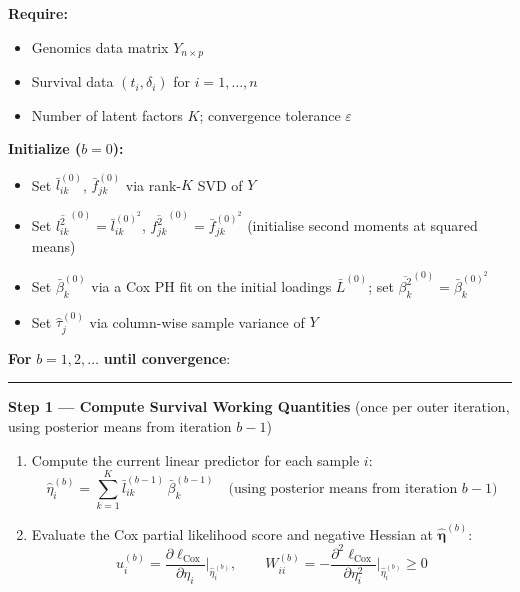 \documentclass{article}[12pt]
\newcommand{\lbar}[2]{\bar{l}_{#1#2}}
\newcommand{\fbar}[2]{\bar{f}_{#1#2}}
\newcommand{\bbar}[1]{\bar{\beta}_{#1}}
\newcommand{\lsec}[2]{\overline{l^{2}_{#1#2}}}
\newcommand{\fsec}[2]{\overline{f^{2}_{#1#2}}}
\newcommand{\bsec}[1]{\overline{\beta^{2}_{#1}}}
\begin{document}
\begin{tcolorbox}[
  breakable,
  colback=gray!4!white, colframe=black!70,
  title={\textbf{Algorithm 1.} Supervised MF --- CAVI Update Procedure},
  fonttitle=\bfseries, left=6pt, right=6pt, top=6pt, bottom=6pt
]

\textbf{Require:}
\begin{itemize}[noitemsep, topsep=2pt]
    \item Genomics data matrix $Y_{n\times p}$
    \item Survival data $(t_i, \delta_i)$ for $i = 1, \ldots, n$
    \item Number of latent factors $K$; convergence tolerance $\varepsilon$
\end{itemize}

\medskip
\textbf{Initialize ($b=0$):}
\begin{itemize}[noitemsep, topsep=2pt]
    \item Set $\lbar{i}{k}^{(0)}$, $\fbar{j}{k}^{(0)}$ via rank-$K$ SVD of $Y$
    \item Set $\lsec{i}{k}^{(0)} = \lbar{i}{k}^{(0)^2}$,
          $\fsec{j}{k}^{(0)} = \fbar{j}{k}^{(0)^2}$
          (initialise second moments at squared means)
    \item Set $\bbar{k}^{(0)}$ via a Cox PH fit on the initial loadings
          $\bar{L}^{(0)}$; set $\bsec{k}^{(0)} = \bbar{k}^{(0)^2}$
    \item Set $\hat{\tau}_j^{(0)}$ via column-wise sample variance of $Y$
\end{itemize}

\bigskip
\textbf{For} $b = 1, 2, \ldots$ \textbf{until convergence}:

\medskip
\hrule
\medskip

\textbf{Step 1 --- Compute Survival Working Quantities}
\quad(once per outer iteration, using posterior means from iteration $b-1$)

\medskip
\begin{enumerate}[label=\textbf{1.\arabic*.}, leftmargin=2cm]
    \item Compute the current linear predictor for each sample $i$:
    \[
        \hat{\eta}_i^{(b)}
        = \sum_{k=1}^{K} \lbar{i}{k}^{(b-1)}\,\bbar{k}^{(b-1)}
        \quad\text{(using posterior means from iteration }b-1\text{)}
    \]

    \item Evaluate the Cox partial likelihood score and negative Hessian
    at $\hat{\bm{\eta}}^{(b)}$:
    \[
        u_i^{(b)} = \frac{\partial\ell_{\text{Cox}}}{\partial\eta_i}
        \Bigg|_{\hat{\eta}_i^{(b)}},
        \qquad
        W_{ii}^{(b)} = -\frac{\partial^2\ell_{\text{Cox}}}{\partial\eta_i^2}
        \Bigg|_{\hat{\eta}_i^{(b)}} \geq 0
    \]


\end{enumerate}
\end{tcolorbox}
\end{document}
